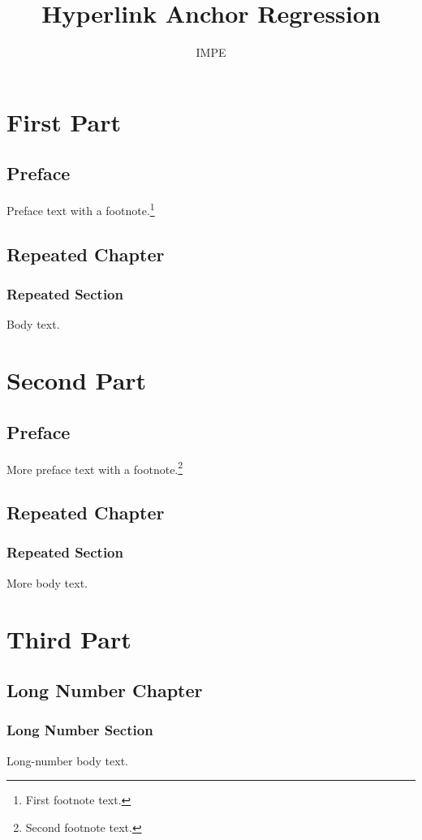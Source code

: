 \documentclass{impereport_zh}
\title{Hyperlink Anchor Regression}
\author{IMPE}
\begin{document}
\maketitle
\tableofcontents

\part{First Part}
\setcounter{chapter}{0}
\chapter*{Preface}
Preface text with a footnote.\footnote{First footnote text.}
\chapter{Repeated Chapter}
\section{Repeated Section}
Body text.

\part{Second Part}
\setcounter{chapter}{0}
\chapter*{Preface}
More preface text with a footnote.\footnote{Second footnote text.}
\chapter{Repeated Chapter}
\setcounter{section}{0}
\section{Repeated Section}
More body text.

\part{Third Part}
\setcounter{chapter}{10}
\chapter{Long Number Chapter}
\setcounter{section}{10}
\section{Long Number Section}
Long-number body text.
\end{document}
